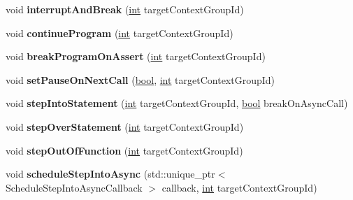 \begin{DoxyCompactItemize}
\item 
\mbox{\label{classv8__inspector_1_1V8Debugger_a4720454e9ef916133ec0e428efc418bc}} 
void {\bfseries interrupt\+And\+Break} (\mbox{\hyperlink{classint}{int}} target\+Context\+Group\+Id)
\item 
\mbox{\label{classv8__inspector_1_1V8Debugger_a8a93b9122b0ae542e1dd66bc03198b51}} 
void {\bfseries continue\+Program} (\mbox{\hyperlink{classint}{int}} target\+Context\+Group\+Id)
\item 
\mbox{\label{classv8__inspector_1_1V8Debugger_af297a934507f210e7b38a2e207233823}} 
void {\bfseries break\+Program\+On\+Assert} (\mbox{\hyperlink{classint}{int}} target\+Context\+Group\+Id)
\item 
\mbox{\label{classv8__inspector_1_1V8Debugger_a2d378871f00552ad0404b52caed65d0e}} 
void {\bfseries set\+Pause\+On\+Next\+Call} (\mbox{\hyperlink{classbool}{bool}}, \mbox{\hyperlink{classint}{int}} target\+Context\+Group\+Id)
\item 
\mbox{\label{classv8__inspector_1_1V8Debugger_ad460f005b6a38b45cfd7b5c57ffc650c}} 
void {\bfseries step\+Into\+Statement} (\mbox{\hyperlink{classint}{int}} target\+Context\+Group\+Id, \mbox{\hyperlink{classbool}{bool}} break\+On\+Async\+Call)
\item 
\mbox{\label{classv8__inspector_1_1V8Debugger_aee2e024bc84b983d1d33f9847e9ee5ce}} 
void {\bfseries step\+Over\+Statement} (\mbox{\hyperlink{classint}{int}} target\+Context\+Group\+Id)
\item 
\mbox{\label{classv8__inspector_1_1V8Debugger_a3db97e0eef3b15d646710ca8b9de3e19}} 
void {\bfseries step\+Out\+Of\+Function} (\mbox{\hyperlink{classint}{int}} target\+Context\+Group\+Id)
\item 
\mbox{\label{classv8__inspector_1_1V8Debugger_aa89f725ed0a78a66c42df55a55ba95f3}} 
void {\bfseries schedule\+Step\+Into\+Async} (std\+::unique\+\_\+ptr$<$ Schedule\+Step\+Into\+Async\+Callback $>$ callback, \mbox{\hyperlink{classint}{int}} target\+Context\+Group\+Id)

\end{DoxyCompactItemize}
